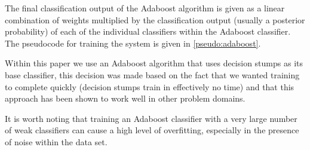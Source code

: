 \documentclass[ %
                    author={Sam Phippen},
                supervisor={Dr. Rafal Bogacz},
                     title={Real time voice activity detectors in noisy personal computing environments},
                  subtitle={},
                    degree={MEng},
                      year={2012} ]{thesis}
\begin{document}
The final classification output of the Adaboost algorithm is given as a linear
combination of weights multiplied by the classification output (usually a
posterior probability) of each of the individual classifiers within the Adaboost
classifier. The pseudocode for training the system is given in \ref{pseudo:adaboost}.

Within this paper we use an Adaboost algorithm that uses decision stumps as its
base classifier, this decision was made based on the fact that we wanted
training to complete quickly (decision stumps train in effectively no time) and
that this approach has been shown to work well in other problem
domains\cite{viola}.

It is worth noting that training an Adaboost classifier with a very large
number of weak classifiers can cause a high level of overfitting, especially
in the presence of noise within the data set.
\end{document}
